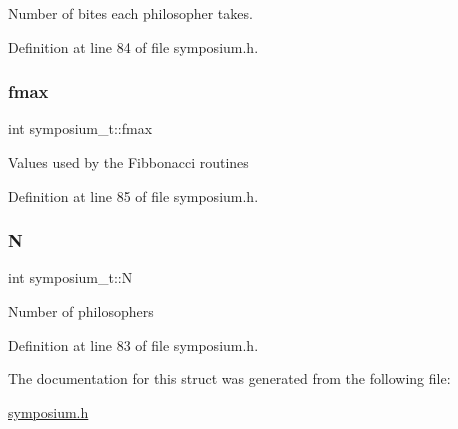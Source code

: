 Number of bites each philosopher takes. 

Definition at line 84 of file symposium.\+h.

\mbox{\label{structsymposium__t_a038b49a350225fed31d5c148a9147ec6}} 
\subsubsection{\texorpdfstring{fmax}{fmax}}
{\footnotesize\ttfamily int symposium\+\_\+t\+::fmax}

Values used by the Fibbonacci routines 

Definition at line 85 of file symposium.\+h.

\mbox{\label{structsymposium__t_a4e366c10036b2d89ebc2dbcdefba8999}} 
\subsubsection{\texorpdfstring{N}{N}}
{\footnotesize\ttfamily int symposium\+\_\+t\+::N}

Number of philosophers 

Definition at line 83 of file symposium.\+h.



The documentation for this struct was generated from the following file\+:\begin{DoxyCompactItemize}
\item 
\hyperlink{symposium_8h}{symposium.\+h}\end{DoxyCompactItemize}

